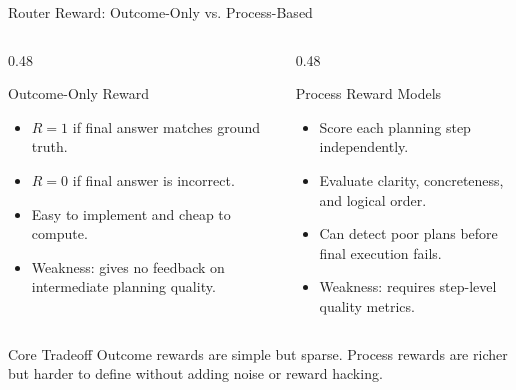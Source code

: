 \documentclass[aspectratio=169,11pt]{beamer}
\newcommand{\tightitems}{\setlength{\itemsep}{0.25em}\setlength{\parskip}{0pt}}
\begin{document}
\begin{frame}{Router Reward: Outcome-Only vs. Process-Based}
\begin{columns}[T,onlytextwidth]
  \begin{column}{0.48\textwidth}
    \begin{block}{Outcome-Only Reward}
    \begin{itemize}\tightitems
      \item $R=1$ if final answer matches ground truth.
      \item $R=0$ if final answer is incorrect.
      \item Easy to implement and cheap to compute.
      \item Weakness: gives no feedback on intermediate planning quality.
    \end{itemize}
    \end{block}
  \end{column}
  \begin{column}{0.48\textwidth}
    \begin{block}{Process Reward Models}
    \begin{itemize}\tightitems
      \item Score each planning step independently.
      \item Evaluate clarity, concreteness, and logical order.
      \item Can detect poor plans before final execution fails.
      \item Weakness: requires step-level quality metrics.
    \end{itemize}
    \end{block}
  \end{column}
\end{columns}

\vspace{0.8em}
\begin{alertblock}{Core Tradeoff}
Outcome rewards are simple but sparse. Process rewards are richer but harder to define without adding noise or reward hacking.
\end{alertblock}
\end{frame}
\end{document}
